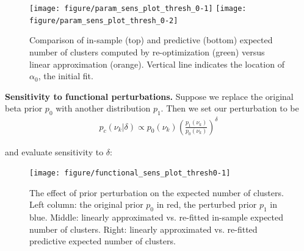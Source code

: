 \documentclass[a0,plainsections,30pt]{sciposter}\usepackage[]{graphicx}\usepackage[]{color}
\newenvironment{knitrout}{}{} %
\begin{document}
\begin{minipage}[t]{0.45\textwidth}
\begin{figure}
\begin{knitrout}
{\centering \texttt{[image: figure/param\_sens\_plot\_thresh\_0-1]} 
\texttt{[image: figure/param\_sens\_plot\_thresh\_0-2]} 

}



\end{knitrout}
\caption{Comparison of in-sample (top) and predictive (bottom) expected number of clusters computed by re-optimization (green) versus linear approximation (orange). 
Vertical line indicates the location of $\alpha_0$, the initial fit. }
\end{figure}

{\bf \large Sensitivity to functional perturbations. }
Suppose we replace the original beta prior $p_0$ with another distribution $p_1$. Then we set our perturbation to be
\vspace{-0.3in}
\begin{align*}
p_c(\nu_k \vert \delta) \propto p_{0}(\nu_k)\left(\frac{p_1(\nu_k)}{p_0(\nu_k)}\right)^\delta
\end{align*}
\vspace{-0.3in}

and evaluate sensitivity to $\delta$:
\vspace{0.1in}
\begin{figure}
\centering

\begin{knitrout}
\color{fgcolor}

{\centering \texttt{[image: figure/functional\_sens\_plot\_thresh0-1]} 

}



\end{knitrout}
\caption{The effect of prior perturbation on the expected number of clusters. Left column: the original prior $p_0$ in red, the perturbed prior $p_1$ in blue. Middle: linearly approximated vs.
re-fitted in-sample expected number of clusters. Right: linearly approximated vs. re-fitted predictive expected number of clusters.}
\end{figure}

\begin{mdframed}[style=MyFrame]
\vspace{-0.6in}

\end{mdframed}
\end{minipage}
\end{document}
